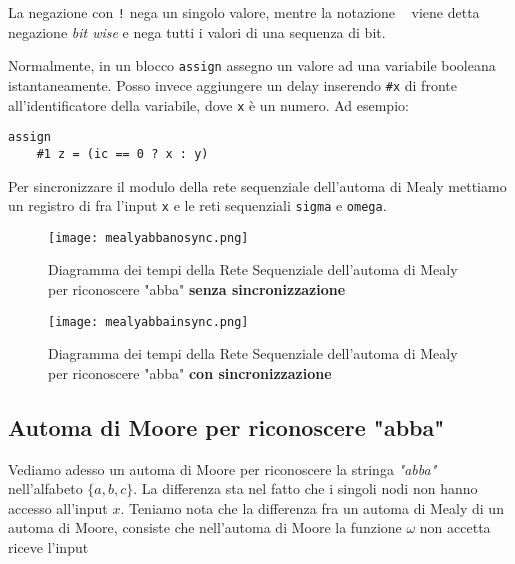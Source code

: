 La negazione con \texttt{!} nega un singolo valore, mentre la notazione \texttt{~} viene detta negazione \textit{bit wise} e nega tutti i valori di una sequenza di bit.

Normalmente, in un blocco \texttt{assign} assegno un valore ad una variabile booleana istantaneamente. Posso invece aggiungere un delay inserendo \texttt{\#x} di fronte all'identificatore della variabile, dove \texttt{x} è un numero. Ad esempio:
\begin{lstlisting}[style={verilog}]
assign 
	#1 z = (ic == 0 ? x : y)
\end{lstlisting}



Per sincronizzare il modulo della rete sequenziale dell'automa di Mealy mettiamo un registro di fra l'input \texttt{x} e le reti sequenziali \texttt{sigma} e \texttt{omega}.

\begin{figure}[!htb]
	\centering 
	\caption{Diagramma dei tempi della Rete Sequenziale dell'automa di Mealy per riconoscere "abba" \textbf{senza sincronizzazione}}
	\texttt{[image: mealyabbanosync.png]}
\end{figure}

\begin{figure}[!htb]
	\centering 
	\caption{Diagramma dei tempi della Rete Sequenziale dell'automa di Mealy per riconoscere "abba" \textbf{con sincronizzazione}}
	\texttt{[image: mealyabbainsync.png]}
\end{figure}

\FloatBarrier

\subsection{Automa di Moore per riconoscere "abba"}
Vediamo adesso un automa di Moore per riconoscere la stringa \textit{"abba"} nell'alfabeto $ \{a,b,c\} $. La differenza sta nel fatto che i singoli nodi non hanno accesso all'input $ x $. Teniamo nota che la differenza fra un automa di Mealy di un automa di Moore, consiste che nell'automa di Moore la funzione $ \omega $ non accetta riceve l'input

